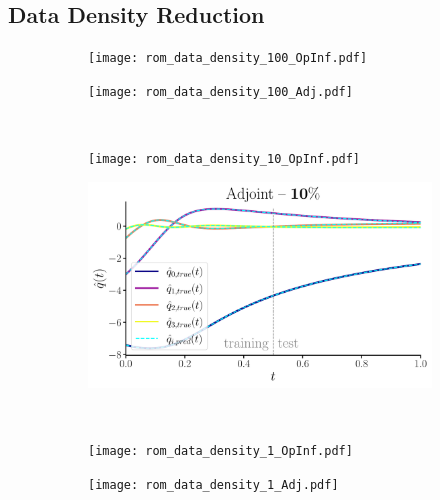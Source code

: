 \newpage


\subsection*{Data Density Reduction}

\vspace{1.0cm}

\begin{figure}[h!]
  \centering
  \begin{subfigure}[c]{0.49\textwidth}
      \centering
      \texttt{[image: rom\_data\_density\_100\_OpInf.pdf]}
  \end{subfigure}
  \begin{subfigure}[c]{0.49\textwidth}
      \centering
      \texttt{[image: rom\_data\_density\_100\_Adj.pdf]}
  \end{subfigure} \\[1ex]
    
  \begin{subfigure}[c]{0.49\textwidth}
      \centering
      \texttt{[image: rom\_data\_density\_10\_OpInf.pdf]}
  \end{subfigure} 
  \begin{subfigure}[c]{0.49\textwidth}
      \centering
      \includegraphics[width=\linewidth]{figures/rom_data_density_10_Adj.pdf}
  \end{subfigure} \\[1ex]
    
  \begin{subfigure}[c]{0.49\textwidth}
      \centering
      \texttt{[image: rom\_data\_density\_1\_OpInf.pdf]}
  \end{subfigure} 
  \begin{subfigure}[c]{0.49\textwidth}
      \centering
      \texttt{[image: rom\_data\_density\_1\_Adj.pdf]}
  \end{subfigure} \\[1ex]
    

\end{figure}
